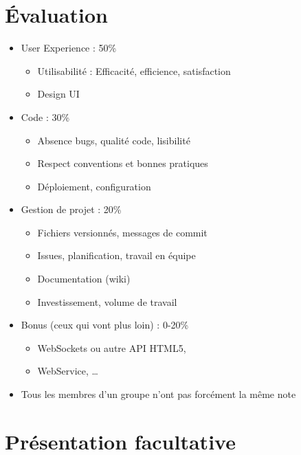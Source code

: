 \hypertarget{uxe9valuation}{%
\section{Évaluation}\label{uxe9valuation}}

\begin{itemize}
\tightlist
\item
  User Experience : 50\%

  \begin{itemize}
  \tightlist
  \item
    Utilisabilité : Efficacité, efficience, satisfaction
  \item
    Design UI
  \end{itemize}
\item
  Code : 30\%

  \begin{itemize}
  \tightlist
  \item
    Absence bugs, qualité code, lisibilité
  \item
    Respect conventions et bonnes pratiques
  \item
    Déploiement, configuration
  \end{itemize}
\item
  Gestion de projet : 20\%

  \begin{itemize}
  \tightlist
  \item
    Fichiers versionnés, messages de commit
  \item
    Issues, planification, travail en équipe
  \item
    Documentation (wiki)
  \item
    Investissement, volume de travail
  \end{itemize}
\item
  Bonus (ceux qui vont plus loin) : 0-20\%

  \begin{itemize}
  \tightlist
  \item
    WebSockets ou autre API HTML5,
  \item
    WebService, \ldots{}
  \end{itemize}
\item
  Tous les membres d'un groupe n'ont pas forcément la même note
\end{itemize}

\hypertarget{pruxe9sentation-facultative}{%
\section{Présentation facultative}\label{pruxe9sentation-facultative}}

